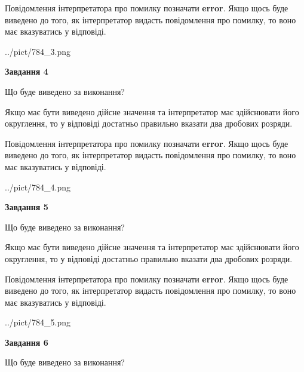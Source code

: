 \documentclass[12pt, ukrainian]{article}
\begin{document}
{\begin {Large}
Повідомлення інтерпретатора про помилку позначати \textbf{error}.
Якщо щось буде виведено до того, як інтерпретатор видасть повідомлення про помилку, 
то воно має вказуватись у відповіді. \par

\begin{center}
	{../pict/784_3.png}
\end{center}
\newpage

{\begin {center}\textbf{Завдання 4}\end {center}}\par
Що буде виведено за виконання? \par

Якщо має бути виведено дійсне значення та інтерпретатор має здійснювати його округлення, 
то у відповіді достатньо правильно вказати два дробових розряди.

Повідомлення інтерпретатора про помилку позначати \textbf{error}.
Якщо щось буде виведено до того, як інтерпретатор видасть повідомлення про помилку, 
то воно має вказуватись у відповіді. \par

\begin{center}
	{../pict/784_4.png}
\end{center}
\newpage

{\begin {center}\textbf{Завдання 5}\end {center}}\par
Що буде виведено за виконання? \par

Якщо має бути виведено дійсне значення та інтерпретатор має здійснювати його округлення, 
то у відповіді достатньо правильно вказати два дробових розряди.

Повідомлення інтерпретатора про помилку позначати \textbf{error}.
Якщо щось буде виведено до того, як інтерпретатор видасть повідомлення про помилку, 
то воно має вказуватись у відповіді. \par

\begin{center}
	{../pict/784_5.png}
\end{center}
\newpage

{\begin {center}\textbf{Завдання 6}\end {center}}\par
Що буде виведено за виконання? \par


\end{Large}}
\end{document}

